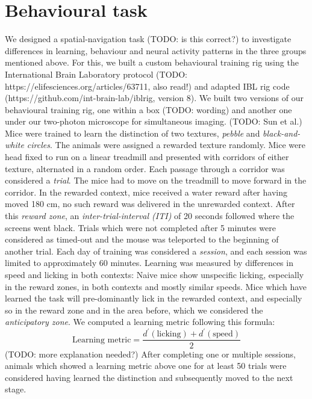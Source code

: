 \section{Behavioural task}
We designed a spatial-navigation task (TODO: is this correct?) to investigate differences in learning, behaviour and neural activity patterns in the three groups mentioned above.
For this, we built a custom behavioural training rig using the International Brain Laboratory protocol (TODO: https://elifesciences.org/articles/63711, also read!) and adapted IBL rig code (https://github.com/int-brain-lab/iblrig, version 8).
We built two versions of our behavioural training rig, one within a box (TODO: wording) and another one under our two-photon microscope for simultaneous imaging.
(TODO: Sun et al.) Mice were trained to learn the distinction of two textures, \textit{pebble} and \textit{black-and-white circles}. The animals were assigned a rewarded texture randomly.  Mice were head fixed to run on a linear treadmill and presented with corridors of either texture, alternated in a random order. Each passage through a corridor was considered a \textit{trial}. The mice had to move on the treadmill to move forward in the corridor. In the rewarded context, mice received a water reward after having moved 180 cm, no such reward was delivered in the unrewarded context. After this \textit{reward zone}, an \textit{inter-trial-interval (ITI)} of 20 seconds followed where the screens went black. Trials which were not completed after 5 minutes were considered as timed-out and the mouse was teleported to the beginning of another trial. Each day of training was considered a \textit{session}, and each session was limited to approximately 60 minutes.
Learning was measured by differences in speed and licking in both contexts: Naive mice show unspecific licking, especially in the reward zones, in both contexts and mostly similar speeds. Mice which have learned the task will pre-dominantly lick in the rewarded context, and especially so in the reward zone and in the area before, which we considered the \textit{anticipatory zone}.
We computed a learning metric following this formula:
\begin{equation}
\text{Learning metric} = \frac{d^{\prime}(\text{licking}) + d^{\prime}(\text{speed})}{2}
\end{equation}
(TODO: more explanation needed?)
After completing one or multiple sessions, animals which showed a learning metric above one for at least 50 trials were considered having learned the distinction and subsequently moved to the next stage.
